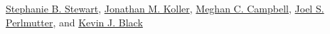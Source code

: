 \href{https://www.authorea.com/users/7404}{Stephanie B. Stewart},
\href{https://www.authorea.com/users/7405}{Jonathan M. Koller}, 
\href{https://www.authorea.com/users/7564}{Meghan C. Campbell}, 
\href{https://www.authorea.com/users/7632}{Joel S. Perlmutter}, and 
\href{https://www.authorea.com/users/4510}{Kevin J. Black}
